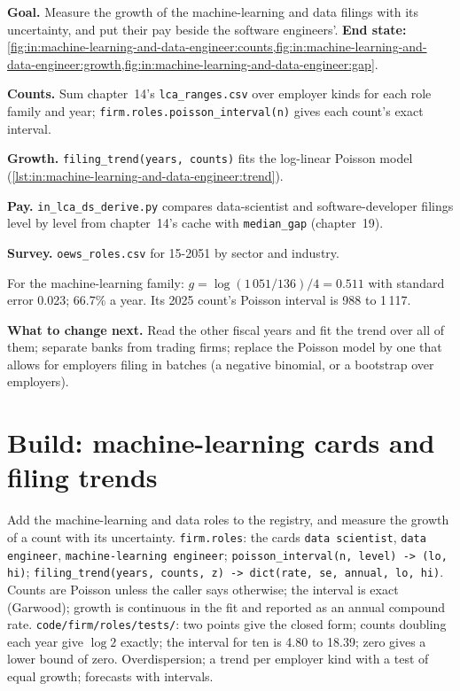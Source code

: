 \begin{tutorial}
\textbf{Goal.} Measure the growth of the machine-learning and data filings with its uncertainty, and put their pay beside
the software engineers'.
\textbf{End state:} \cref{fig:in:machine-learning-and-data-engineer:counts,fig:in:machine-learning-and-data-engineer:growth,fig:in:machine-learning-and-data-engineer:gap}.
\begin{tutsteps}
\item \textbf{Counts.} Sum chapter~14's \texttt{lca\_ranges.csv} over employer kinds for each role family and year;
\texttt{firm.roles.poisson\_interval(n)} gives each count's exact interval.
\item \textbf{Growth.} \texttt{filing\_trend(years, counts)} fits the log-linear Poisson model
(\cref{lst:in:machine-learning-and-data-engineer:trend}).
\label{lst:in:machine-learning-and-data-engineer:trend}
\item \textbf{Pay.} \texttt{in\_lca\_ds\_derive.py} compares data-scientist and software-developer filings level by level
from chapter~14's cache with \texttt{median\_gap} (chapter~19).
\item \textbf{Survey.} \texttt{oews\_roles.csv} for 15-2051 by sector and industry.
\end{tutsteps}
\end{tutorial}

For the machine-learning family: $g=\log(1\,051/136)/4=0.511$ with standard error 0.023; 66.7\% a year. Its 2025 count's
Poisson interval is 988 to 1\,117.

\textbf{What to change next.} Read the other fiscal years and fit the trend over all of them; separate banks from trading
firms; replace the Poisson model by one that allows for employers filing in batches (a negative binomial, or a bootstrap
over employers).

\section{Build: machine-learning cards and filing trends}\label{bld:in:machine-learning-and-data-engineer:roles}

\begin{build}
 Add the machine-learning and data roles to the registry, and measure the growth of a count with its
uncertainty.
 \texttt{firm.roles}: the cards \texttt{data scientist}, \texttt{data engineer},
\texttt{machine-learning engineer}; \texttt{poisson\_interval(n, level) -> (lo, hi)};
\texttt{filing\_trend(years, counts, z) -> dict(rate, se, annual, lo, hi)}.
 Counts are Poisson unless the caller says otherwise; the interval is exact (Garwood); growth is
continuous in the fit and reported as an annual compound rate.
 \texttt{code/firm/roles/tests/}: two points give the closed form; counts doubling each year give
$\log 2$ exactly; the interval for ten is 4.80 to 18.39; zero gives a lower bound of zero.
 Overdispersion; a trend per employer kind with a test of equal growth; forecasts with intervals.
\end{build}

